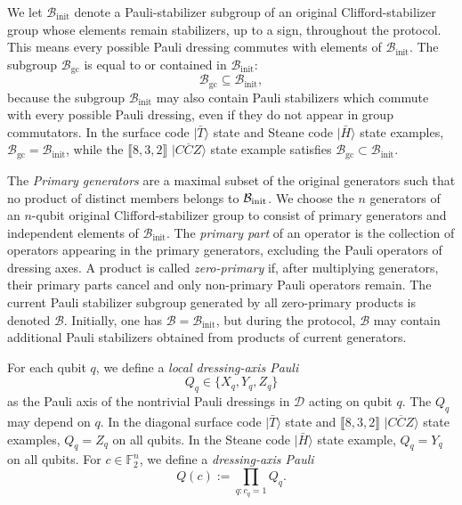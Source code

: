 \documentclass[
 reprint,
 amsmath,amssymb,
 pra,superscriptaddress, nofootinbib
]{revtex4-2}
\theoremstyle{definition}
\theoremstyle{plain}
\begin{document}
We let $\mathcal{B}_\mathrm{init}$ denote a Pauli-stabilizer subgroup of an original Clifford-stabilizer group whose elements remain stabilizers, up to a sign, throughout the protocol. 
This means every possible Pauli dressing commutes with elements of $\mathcal{B}_\mathrm{init}$. The subgroup $\mathcal B_\mathrm{gc}$ is equal to or contained in $\mathcal{B}_\mathrm{init}$:
\begin{equation}
  \mathcal B_\mathrm{gc} \subseteq \mathcal{B}_\mathrm{init},
\end{equation}
because the subgroup $\mathcal{B}_\mathrm{init}$ may also contain Pauli stabilizers which commute with every possible Pauli dressing, even if they do not appear in group commutators. In the surface code $|\bar{T}\rangle$ state and Steane code $|\bar{H}\rangle$ state examples, $\mathcal B_\mathrm{gc} = \mathcal{B}_\mathrm{init}$, while the $\llbracket 8,3,2 \rrbracket$ $|\overline{CCZ}\rangle$ state example satisfies $\mathcal B_\mathrm{gc} \subset \mathcal{B}_\mathrm{init}$.

The \emph{Primary generators} are a maximal subset of the original generators such that no product of distinct members belongs to $\mathcal{B}_{\rm init}$.
We choose the $n$ generators of an $n$-qubit original Clifford-stabilizer group to consist of primary generators and independent elements of $\mathcal{B}_\mathrm{init}$.
The \emph{primary part} of an operator is the collection of operators appearing in the primary generators, excluding the Pauli operators of dressing axes.
A product is called \textit{zero-primary} if, after multiplying generators, their primary parts cancel and only non-primary Pauli operators remain.
The current Pauli stabilizer subgroup generated by all zero-primary products is denoted $\mathcal{B}$. Initially, one has $\mathcal{B}=\mathcal{B}_\mathrm{init}$, but during the protocol, $\mathcal{B}$ may contain additional Pauli stabilizers obtained from products of current generators. 

For each qubit $q$, we define a \emph{local dressing-axis Pauli}
\begin{equation}
  Q_q\in\{X_q,Y_q,Z_q\}
  \label{eq:local_dressing_axis_pauli}
\end{equation}
as the Pauli axis of the nontrivial Pauli dressings in $\mathcal{D}$ acting
on qubit $q$.
The $Q_q$ may depend on $q$.
In the diagonal surface code $|\bar{T}\rangle$ state and $\llbracket 8,3,2 \rrbracket$ $|\overline{CCZ}\rangle$ state examples, $Q_q=Z_q$ on all qubits. In the Steane code $|\bar{H}\rangle$ state example, $Q_q=Y_q$ on all qubits.
For $c\in\mathbb{F}_2^n$, we define a \emph{dressing-axis Pauli}
\begin{equation}
  Q(c):=\prod_{q:c_q=1} Q_q .
  \label{eq:dressing_axis_pauli}
\end{equation}
\end{document}
